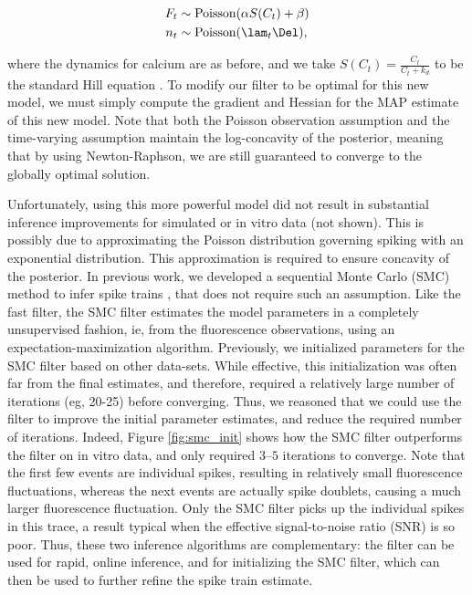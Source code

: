 \begin{align}
	F_t &\sim \text{Poisson}(\alpha S(C_t) + \beta) \label{eq:nonlin} \\
	n_t &\sim \text{Poisson}(\lam_t \Del),
\end{align}

\noindent where the dynamics for calcium are as before, and we take $S(C_t)=\frac{C_t}{C_t + k_d}$ to be the standard Hill equation \cite{PologrutoSvoboda04}.  To modify our \foopsi filter to be optimal for this new model, we must simply compute the gradient and Hessian for the MAP estimate of this new model.  Note that both the Poisson observation assumption and the time-varying assumption maintain the log-concavity of the posterior, meaning that by using Newton-Raphson, we are still guaranteed to converge to the globally optimal solution.   

Unfortunately, using this more powerful model did not result in substantial inference improvements for simulated or in vitro data (not shown).  This is possibly due to approximating the Poisson distribution governing spiking with an exponential distribution.  This approximation is required to ensure concavity of the posterior.  In previous work, we developed a sequential Monte Carlo (SMC) method to infer spike trains \cite{VogelsteinPaninski09}, that does not require such an assumption. Like the fast filter, the SMC filter estimates the model parameters in a completely unsupervised fashion, ie, from the fluorescence observations, using an expectation-maximization algorithm.  Previously, we initialized parameters for the SMC filter based on other data-sets.  While effective, this initialization was often far from the final estimates, and therefore, required a relatively large number of iterations (eg, 20-25) before converging.  Thus, we reasoned that we could use the \foopsi filter to improve the initial parameter estimates, and reduce the required number of iterations.  Indeed, Figure \ref{fig:smc_init} shows how the SMC filter outperforms the \foopsi filter on in vitro data, and only required $3$--$5$ iterations to converge.  Note that the first few events are individual spikes, resulting in relatively small fluorescence fluctuations, whereas the next events are actually spike doublets, causing a much larger fluorescence fluctuation.  Only the SMC filter picks up the individual spikes in this trace, a result typical when the effective signal-to-noise ratio (SNR) is so poor.  Thus, these two inference algorithms are complementary: the \foopsi filter can be used for rapid, online inference, and for initializing the SMC filter, which can then be used to further refine the spike train estimate.

